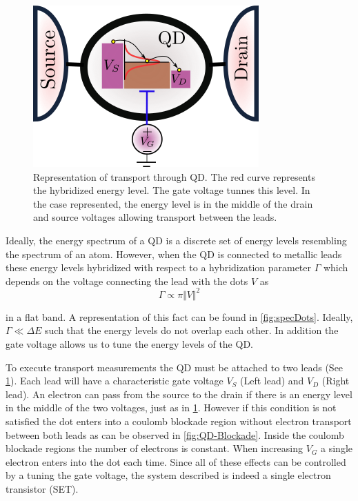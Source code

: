 \begin{figure}[b]
    \centering
    \includegraphics[scale=0.7]{IMAGES/Preliminars/QD-Transport.png}
    \caption{ Representation of transport through QD. The red curve represents the hybridized energy level. The gate voltage tunnes this level. In the case represented, the energy level is in the middle of the drain and source voltages allowing transport between the leads.   \protect{} }
    \label{fig:QD-transport}
\end{figure}




Ideally, the energy spectrum of a QD is a discrete set of energy levels resembling the spectrum of an atom. However, when the QD is connected to metallic leads these energy levels hybridized with respect to a hybridization parameter $\Gamma$ which depends on the voltage connecting the lead with the dots $V$ as 
\begin{equation}
    \Gamma \propto \pi \Vert V \Vert^2
\end{equation}

in a flat band. A representation of this fact can be found in  \ref{fig:specDots}. Ideally, $\Gamma \ll \Delta E$ such that the energy levels do not overlap each other. In addition the gate voltage allows us to tune the energy levels of the QD.

To execute transport measurements the QD must be attached to two leads (See \ref{fig:QD-transport}). Each lead will have a characteristic gate voltage $V_S$ (Left lead) and $V_D$ (Right lead). An electron can pass from the source to the drain if there is an energy level in the middle of the two voltages, just as in \ref{fig:QD-transport}. However if this condition is not satisfied the dot enters into a coulomb blockade region without  electron transport between both leads as can be observed in \ref{fig:QD-Blockade}. Inside the coulomb blockade regions the number of electrons is constant. When increasing $V_G$ a single electron enters into the dot each time. Since all of these effects can be controlled by a tuning the gate voltage, the system described is indeed a single electron transistor (SET).  


